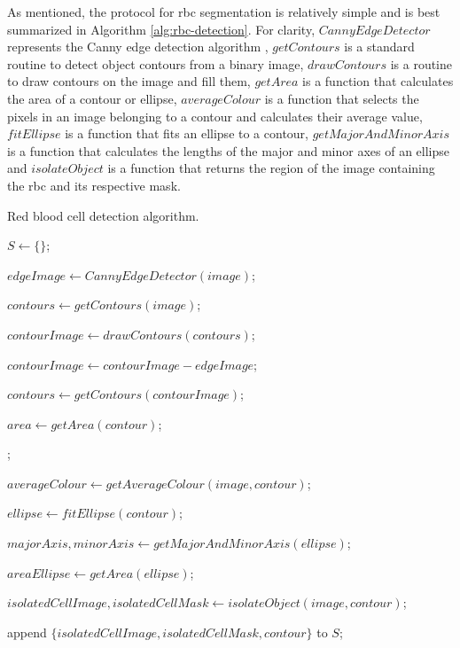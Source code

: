 As mentioned, the protocol for \ac{rbc} segmentation is relatively simple and is best summarized in Algorithm \ref{alg:rbc-detection}. For clarity, $CannyEdgeDetector$ represents the Canny edge detection algorithm \cite{Canny1986-pi}, $getContours$ is a standard routine to detect object contours from a binary image, $drawContours$ is a routine to draw contours on the image and fill them, $getArea$ is a function that calculates the area of a contour or ellipse, $averageColour$ is a function that selects the pixels in an image belonging to a contour and calculates their average value, $fitEllipse$ is a function that fits an ellipse to a contour, $getMajorAndMinorAxis$ is a function that calculates the lengths of the major and minor axes of an ellipse and $isolateObject$ is a function that returns the region of the image containing the \ac{rbc} and its respective mask. 

\begin{algorithm}[!ht]
    \caption{Red blood cell detection algorithm.}\label{alg:rbc-detection}


    $S \gets \{\}$;

    $edgeImage \gets CannyEdgeDetector(image)$;

    $contours \gets getContours(image)$;

    $contourImage \gets drawContours(contours)$;

    $contourImage \gets contourImage - edgeImage$;

    $contours \gets getContours(contourImage)$;

     {
        $area \gets getArea(contour)$;

        ;
        {
            $averageColour \gets getAverageColour(image,contour)$;

            {
                $ellipse \gets fitEllipse(contour)$;

                $majorAxis,minorAxis \gets getMajorAndMinorAxis(ellipse)$;

                $areaEllipse \gets getArea(ellipse)$;

                {
                    $isolatedCellImage,isolatedCellMask \gets isolateObject(image,contour)$;

                    append $\{isolatedCellImage,isolatedCellMask,contour\}$ to $S$;
                }
            }
        }
    }
\end{algorithm}    

